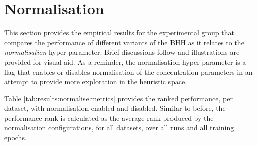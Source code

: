 \section{Normalisation}\label{sec:results:normalise}

This section provides the empirical results for the experimental group that compares the performance of different variants of the \acs{BHH} as it relates to the \textit{normalisation} hyper-parameter. Brief discussions follow and illustrations are provided for visual aid. As a reminder, the normalisation hyper-parameter is a flag that enables or disables normalisation of the concentration parameters in an attempt to provide more exploration in the heuristic space.

Table \ref{tab:results:normalise:metrics} provides the ranked performance, per dataset, with normalisation enabled and disabled. Similar to before, the performance rank is calculated as the average rank produced by the normalisation configurations, for all datasets, over all runs and all training epochs.

